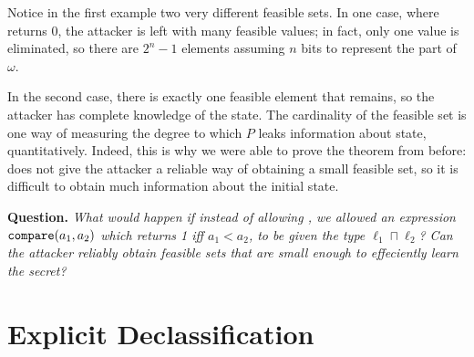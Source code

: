 \documentclass[11pt,twoside]{scrartcl}
\begin{document}
Notice in the first example two very different feasible sets. In one case, where  returns 0, the attacker is left with many feasible values; in fact, only one value is eliminated, so there are $2^n-1$ elements assuming $n$ bits to represent the \hisec part of $\omega$. 

In the second case, there is exactly one feasible element that remains, so the attacker has complete knowledge of the \hisec state. The cardinality of the feasible set is one way of measuring the degree to which $P$ leaks information about \hisec state, quantitatively. Indeed, this is why we were able to prove the theorem from before:  does not give the attacker a reliable way of obtaining a small feasible set, so it is difficult to obtain much information about the \hisec initial state. 

\textbf{Question.} \emph{What would happen if instead of allowing , we allowed an expression $\texttt{\upshape compare}(a_1,a_2)$ which returns 1 iff $a_1 < a_2$, to be given the type $\ell_1 \sqcap \ell_2$? Can the attacker reliably obtain feasible sets that are small enough to effeciently learn the secret?}

\section{Explicit Declassification}
\end{document}
